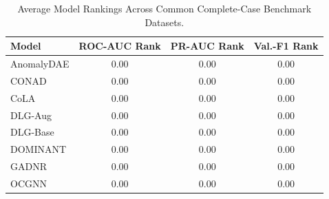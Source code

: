 \begin{table}[h]
\centering
\caption{Average Model Rankings Across Common Complete-Case Benchmark Datasets.}
\label{tab:statistical_rankings}
\small
\begin{tabular}{l c c c}
\toprule
\textbf{Model} & \textbf{ROC-AUC Rank} & \textbf{PR-AUC Rank} & \textbf{Val.-F1 Rank} \\
\midrule
AnomalyDAE & 0.00 & 0.00 & 0.00 \\
CONAD & 0.00 & 0.00 & 0.00 \\
CoLA & 0.00 & 0.00 & 0.00 \\
DLG-Aug & 0.00 & 0.00 & 0.00 \\
DLG-Base & 0.00 & 0.00 & 0.00 \\
DOMINANT & 0.00 & 0.00 & 0.00 \\
GADNR & 0.00 & 0.00 & 0.00 \\
OCGNN & 0.00 & 0.00 & 0.00 \\
\bottomrule
\end{tabular}
\end{table}
